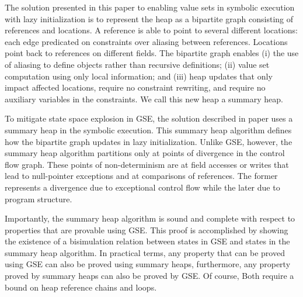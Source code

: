
The solution presented in this paper to enabling value sets in
symbolic execution with lazy initialization is to represent the heap
as a bipartite graph consisting of references and locations. A
reference is able to point to several different locations: each edge
predicated on constraints over aliasing between references. Locations
point back to references on different fields. The bipartite graph
enables (i) the use of aliasing to define objects rather than
recursive definitions; (ii) value set computation using only local
information; and (iii) heap updates that only impact affected
locations, require no constraint rewriting, and require no auxiliary
variables in the constraints.  We call this new heap a summary heap.

To mitigate state space explosion in GSE, the solution described in
paper uses a summary heap in the symbolic execution. This summary heap
algorithm defines how the bipartite graph updates in lazy
initialization. Unlike GSE, however, the summary heap algorithm
partitions only at points of divergence in the control flow
graph. These points of non-determinism are at field accesses or writes
that lead to null-pointer exceptions and at comparisons of
references. The former represents a divergence due to exceptional
control flow while the later due to program structure.


Importantly, the summary heap algorithm is sound and complete with
respect to properties that are provable using GSE. This proof is
accomplished by showing the existence of a bisimulation relation
between states in GSE and states in the summary heap algorithm. In
practical terms, any property that can be proved using GSE can also be
proved using summary heaps, furthermore, any property proved by
summary heaps can also be proved by GSE. Of course, Both require a bound on heap
reference chains and loops.

